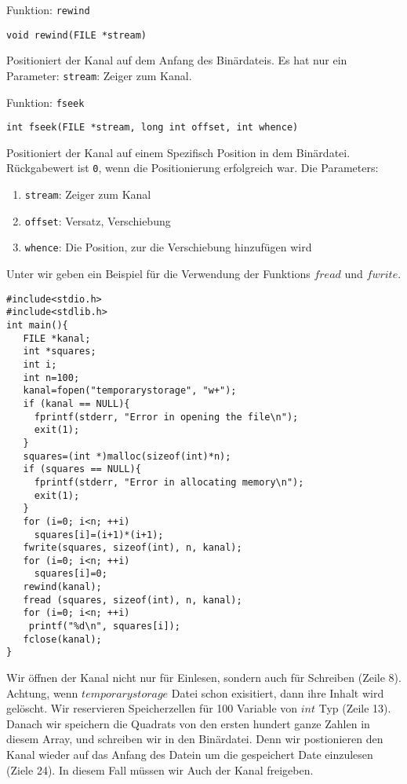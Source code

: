 \begin{myexampleblock}{Funktion: \texttt{rewind}}
\begin{lstlisting}
void rewind(FILE *stream)
\end{lstlisting}
\vspace{-0.4cm}
Positioniert der Kanal auf dem Anfang des Binärdateis.
Es hat nur ein Parameter: \texttt{stream}: Zeiger zum Kanal.
\end{myexampleblock}
\begin{myexampleblock}{Funktion: \texttt{fseek}}
\begin{lstlisting}
int fseek(FILE *stream, long int offset, int whence)
\end{lstlisting}
\vspace{-0.4cm}
Positioniert der Kanal auf einem Spezifisch Position in dem 
Binärdatei. Rückgabewert ist \texttt{0}, wenn die Positionierung erfolgreich war. Die Parameters:
\begin{enumerate}
\item \texttt{stream}: Zeiger zum Kanal
\item \texttt{offset}: Versatz, Verschiebung
\item \texttt{whence}: Die Position, zur die Verschiebung hinzufügen wird
\end{enumerate}
\end{myexampleblock}
Unter wir geben ein Beispiel für die Verwendung der Funktions $fread$ und $fwrite$.
\begin{lstlisting}
#include<stdio.h>
#include<stdlib.h>
int main(){
   FILE *kanal;
   int *squares;
   int i;
   int n=100;
   kanal=fopen("temporarystorage", "w+");
   if (kanal == NULL){
     fprintf(stderr, "Error in opening the file\n");
     exit(1);
   }
   squares=(int *)malloc(sizeof(int)*n);
   if (squares == NULL){
     fprintf(stderr, "Error in allocating memory\n");
     exit(1);
   }
   for (i=0; i<n; ++i)
     squares[i]=(i+1)*(i+1);
   fwrite(squares, sizeof(int), n, kanal);
   for (i=0; i<n; ++i)
     squares[i]=0;
   rewind(kanal); 
   fread (squares, sizeof(int), n, kanal);
   for (i=0; i<n; ++i)
    printf("%d\n", squares[i]);
   fclose(kanal);
}   
\end{lstlisting}
Wir öffnen der Kanal nicht nur für Einlesen, sondern auch für Schreiben (Zeile 8). Achtung, wenn $temporarystorage$ 
Datei schon exisitiert, dann ihre Inhalt wird gelöscht. Wir reservieren Speicherzellen für 100 Variable von $int$ Typ (Zeile 13).
Danach wir speichern die Quadrats von den ersten hundert ganze Zahlen in diesem Array, und schreiben wir in den 
Binärdatei. Denn wir postionieren den Kanal wieder auf das Anfang des Datein um  die gespeichert Date einzulesen (Ziele 24).
In diesem Fall müssen wir Auch der Kanal freigeben.
